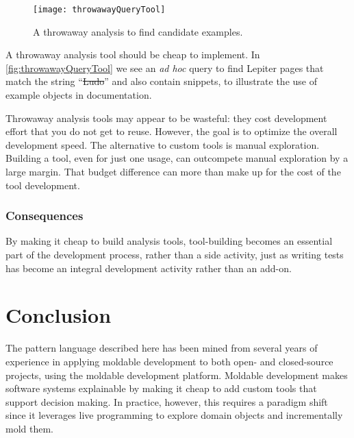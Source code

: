 \documentclass[sigconf]{acmart}
\renewcommand{\nbc}[3]{} %
\newcommand\wc[1]{\nbc{Ward}{#1}{teal}}
\newcommand\eog[1]{\nbc{Edward}{#1}{purple}}
\newcommand{\pattern}[1]{\emph{\nameref{pat:#1}}\xspace}
\newcommand{\GT}{\lst{GT}\xspace} %
\begin{document}
\begin{figure}[h]
  \texttt{[image: throwawayQueryTool]}
  \caption{A throwaway analysis to find candidate examples.}
  \label{fig:throwawayQueryTool}
\end{figure}

\eog{Project Diary, I think this is really cool.
It's just not legible in this size.
I wonder if splitting it over to figures to enhance its legibility.}

A throwaway analysis tool should be cheap to implement.
In \autoref{fig:throwawayQueryTool} we see an \emph{ad hoc} query to find Lepiter \pattern{projectDiary} pages that match the string ``\st{Ludo}'' and also contain \pattern{exampleObject} snippets, to illustrate the use of example objects in documentation.

Throwaway analysis tools may appear to be wasteful: they cost development effort that you do not get to reuse.
However, the goal is to optimize the overall development speed.
The alternative to custom tools is manual exploration.
Building a tool, even for just one usage, can outcompete manual exploration by a large margin.
That budget difference can more than make up for the cost of the tool development.

\subsubsection*{Consequences}
By making it cheap to build analysis tools, tool-building becomes an essential part of the development process, rather than a side activity, just as writing tests has become an integral development activity rather than an add-on.

\section{Conclusion}

The pattern language described here has been mined from several years of experience in applying moldable development to both open- and closed-source projects, using the \GT moldable development platform.
Moldable development makes software systems explainable by making it cheap to add custom tools that support decision making.
In practice, however, this requires a paradigm shift since it leverages live programming to explore domain objects and incrementally mold them.
\end{document}
